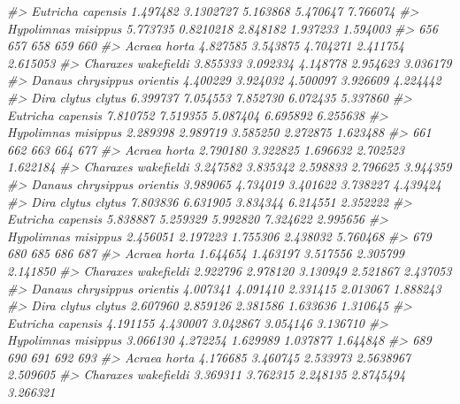 \documentclass[
]{article}
\newenvironment{Shaded}{\begin{snugshade}}{\end{snugshade}}
\newcommand{\CommentTok}[1]{\textcolor[rgb]{0.56,0.35,0.01}{\textit{#1}}}
\begin{document}
\begin{Shaded}
\begin{Highlighting}[]
\CommentTok{\#\textgreater{} Eutricha capensis          1.497482 3.1302727 5.163868 5.470647 7.766074}
\CommentTok{\#\textgreater{} Hypolimnas misippus        5.773735 0.8210218 2.848182 1.937233 1.594003}
\CommentTok{\#\textgreater{}                                 656      657      658      659      660}
\CommentTok{\#\textgreater{} Acraea horta               4.827585 3.543875 4.704271 2.411754 2.615053}
\CommentTok{\#\textgreater{} Charaxes wakefieldi        3.855333 3.092334 4.148778 2.954623 3.036179}
\CommentTok{\#\textgreater{} Danaus chrysippus orientis 4.400229 3.924032 4.500097 3.926609 4.224442}
\CommentTok{\#\textgreater{} Dira clytus clytus         6.399737 7.054553 7.852730 6.072435 5.337860}
\CommentTok{\#\textgreater{} Eutricha capensis          7.810752 7.519355 5.087404 6.695892 6.255638}
\CommentTok{\#\textgreater{} Hypolimnas misippus        2.289398 2.989719 3.585250 2.272875 1.623488}
\CommentTok{\#\textgreater{}                                 661      662      663      664      677}
\CommentTok{\#\textgreater{} Acraea horta               2.790180 3.322825 1.696632 2.702523 1.622184}
\CommentTok{\#\textgreater{} Charaxes wakefieldi        3.247582 3.835342 2.598833 2.796625 3.944359}
\CommentTok{\#\textgreater{} Danaus chrysippus orientis 3.989065 4.734019 3.401622 3.738227 4.439424}
\CommentTok{\#\textgreater{} Dira clytus clytus         7.803836 6.631905 3.834344 6.214551 2.352222}
\CommentTok{\#\textgreater{} Eutricha capensis          5.838887 5.259329 5.992820 7.324622 2.995656}
\CommentTok{\#\textgreater{} Hypolimnas misippus        2.456051 2.197223 1.755306 2.438032 5.760468}
\CommentTok{\#\textgreater{}                                 679      680      685      686      687}
\CommentTok{\#\textgreater{} Acraea horta               1.644654 1.463197 3.517556 2.305799 2.141850}
\CommentTok{\#\textgreater{} Charaxes wakefieldi        2.922796 2.978120 3.130949 2.521867 2.437053}
\CommentTok{\#\textgreater{} Danaus chrysippus orientis 4.007341 4.091410 2.331415 2.013067 1.888243}
\CommentTok{\#\textgreater{} Dira clytus clytus         2.607960 2.859126 2.381586 1.633636 1.310645}
\CommentTok{\#\textgreater{} Eutricha capensis          4.191155 4.430007 3.042867 3.054146 3.136710}
\CommentTok{\#\textgreater{} Hypolimnas misippus        3.066130 4.272254 1.629989 1.037877 1.644848}
\CommentTok{\#\textgreater{}                                 689      690      691       692      693}
\CommentTok{\#\textgreater{} Acraea horta               4.176685 3.460745 2.533973 2.5638967 2.509605}
\CommentTok{\#\textgreater{} Charaxes wakefieldi        3.369311 3.762315 2.248135 2.8745494 3.266321}

\end{Highlighting}
\end{Shaded}
\end{document}
